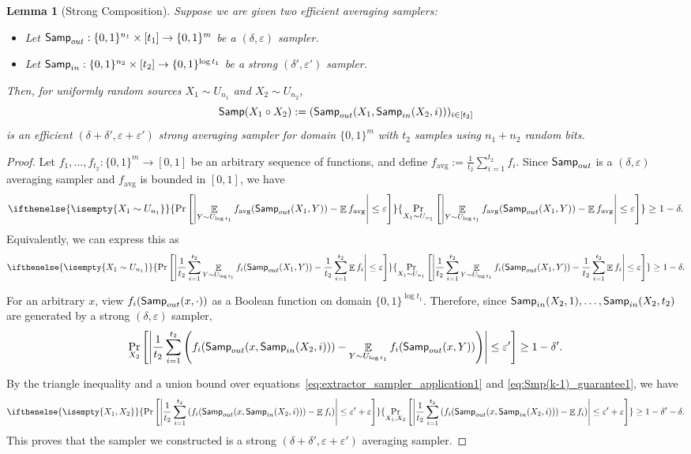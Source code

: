 \documentclass[11pt,letterpaper]{article}
\newtheorem{lemma}[theorem]{Lemma}
\DeclareMathOperator*{\E}{\mathbb{E}}
\newcommand{\eps}{\varepsilon}
\newcommand{\1}{\mathbbm{1}}
\newcommand{\abs}[1]{\left|#1\right| }
\newcommand{\tuple}[1]{\left(#1\right)}
\newcommand{\zo}{\{0, 1\}}
\newcommand{\Smp}{\textup{\textsf{Samp}}}
\newcommand{\Prb}[2][]{ \ifthenelse{\isempty{#1}}
  {\Pr\left[#2\right]}
  {\Pr_{#1}\left[#2\right]} }
\begin{document}
\begin{lemma}[Strong Composition]
    \label{lem:new_NZ}
    Suppose we are given two efficient averaging samplers:
\begin{itemize}
    \item  Let $\Smp_{out}: \zo^{n_1} \times [t_1] \to \zo^m$ be a $(\delta, \eps)$ sampler.
    \item Let $\Smp_{in}: \zo^{n_2} \times [t_2] \to \zo^{\log t_1}$ be a strong $(\delta', \eps')$ sampler.
\end{itemize}
 Then, for uniformly random sources $X_{1} \sim U_{n_1}$ and $X_{2} \sim U_{n_2}$, \[
        \Smp(X_1 \circ X_2):= (\Smp_{out}(X_1, \Smp_{in}(X_2, i)))_{i \in [t_2]}
    \]
    is an efficient $(\delta + \delta', \eps + \eps')$ strong averaging sampler for domain $\zo^m$ with $t_2$ samples using $n_1 + n_2$ random bits. 
\end{lemma}



\begin{proof}
    Let $f_1, \dots, f_{t_2} :  \zo^m \to [0, 1]$ be an arbitrary sequence of functions, and define $f_{\text{avg}} := \frac{1}{t_2} \sum_{i=1}^{t_2} f_{i}$.
    Since $\Smp_{out}$ is a $(\delta, \eps)$ averaging sampler and $f_{\text{avg}}$ is bounded in $[0, 1]$, we have \[
        \Prb[X_1 \sim U_{n_1}]{\abs{\E_{Y \sim U_{\log t_1}}{f_{\text{avg}}(\Smp_{out}(X_1, Y))} - \E f_{\text{avg}}} \le {\eps}} \ge 1 - \delta.
    \]
    Equivalently, we can express this as 
    \begin{equation}
        \label{eq:extractor_sampler_application1}
       \Prb[X_1 \sim U_{n_1}]{\abs{\frac{1}{t_2}\sum_{i=1}^{t_2} \E_{Y \sim U_{\log t_1}}{f_i(\Smp_{out}(X_1, Y))} - \frac{1}{t_2}\sum_{i=1}^{t_2} \E f_{i}} \le {\eps}} \ge 1 - \delta.
    \end{equation}
    
    For an arbitrary $x$, view $f_i(\Smp_{out}(x, \cdot))$  as a Boolean function on domain $\zo^{\log t_1}$. Therefore, since $\Smp_{in}(X_2, 1), \dots, \Smp_{in}(X_2, t_2)$ are generated by a strong $(\delta, \eps)$ sampler,
    \begin{equation}
        \label{eq:Smp(k-1)_guarantee1}
        \Pr_{X_2}\left[{\abs{\frac{1}{t_2}\sum_{i=1}^{t_2} \tuple{f_i(\Smp_{out}(x, \Smp_{in}(X_2, i))) - \E_{Y \sim U_{\log t_1}}{f_i(\Smp_{out}(x, Y))}}} \le {\eps'}}\right] \ge 1 - {\delta'}.
    \end{equation}
  
    By the triangle inequality and a union bound over equations~\eqref{eq:extractor_sampler_application1} and \eqref{eq:Smp(k-1)_guarantee1}, we have \[
    \Prb[X_1, X_2]{
       \abs{\frac{1}{t_2}\sum_{i=1}^{t_2}\tuple{ f_i(\Smp_{out}(x, \Smp_{in}(X_2, i)))  - \E f_i}} \le \eps' + \eps} \ge 1 - \delta' - \delta .
    \]
    This proves that the sampler we constructed is a strong $(\delta + \delta', \eps + \eps')$ averaging sampler.
\end{proof}
\end{document}
